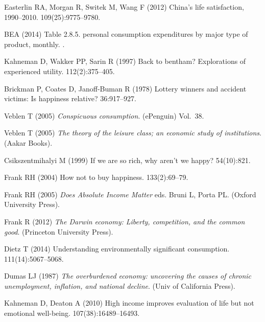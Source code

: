 \documentclass[10pt, letterpaper]{article}
\begin{document}
\begin{spacing}{1.4}
\begin{thebibliography}{10}
Easterlin RA, Morgan R, Switek M, Wang F (2012) China's life satisfaction,
  1990--2010.
  109(25):9775--9780.

BEA (2014) Table 2.8.5. personal consumption expenditures by major type of
  product, monthly.
.

Kahneman D, Wakker PP, Sarin R (1997) Back to bentham? {E}xplorations of
  experienced utility.
 112(2):375--405.

Brickman P, Coates D, Janoff-Buman R (1978) Lottery winners and accident
  victims: Is happiness relative?
 36:917--927.

Veblen T (2005) {\em Conspicuous consumption}.
\newblock (ePenguin) Vol.{}~38.

Veblen T (2005) {\em The theory of the leisure class; an economic study of
  institutions}.
\newblock (Aakar Books).

Csikszentmihalyi M (1999) If we are so rich, why aren't we happy?
 54(10):821.

Frank RH (2004) How not to buy happiness.
 133(2):69--79.

Frank RH (2005) {\em Does Absolute Income Matter} eds.{} Bruni L, Porta PL.
\newblock (Oxford University Press).

Frank R (2012) {\em The Darwin economy: Liberty, competition, and the common
  good}.
\newblock (Princeton University Press).

Dietz T (2014) Understanding environmentally significant consumption.
  111(14):5067--5068.

Dumas LJ (1987) {\em The overburdened economy: uncovering the causes of chronic
  unemployment, inflation, and national decline}.
\newblock (Univ of California Press).

Kahneman D, Deaton A (2010) High income improves evaluation of life but not
  emotional well-being.
  107(38):16489--16493.


\end{thebibliography}
\end{spacing}
\end{document}
